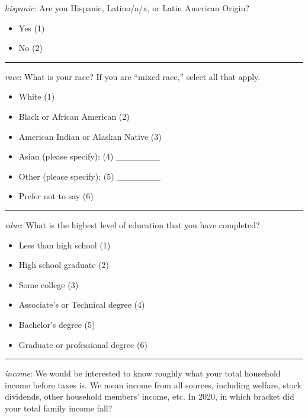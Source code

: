 \emph{hispanic}: Are you Hispanic, Latino/a/x, or Latin American Origin?

\begin{itemize}
\tightlist
\item
  Yes (1)
\item
  No (2)
\end{itemize}

\begin{center}\rule{0.5\linewidth}{0.5pt}\end{center}

\emph{race}: What is your race? If you are ``mixed race,'' select all that apply.

\begin{itemize}
\tightlist
\item
  White (1)
\item
  Black or African American (2)
\item
  American Indian or Alaskan Native (3)
\item
  Asian (please specify): (4) \_\_\_\_\_\_\_
\item
  Other (please specify): (5) \_\_\_\_\_\_\_
\item
  Prefer not to say (6)
\end{itemize}

\begin{center}\rule{0.5\linewidth}{0.5pt}\end{center}

\emph{educ}: What is the highest level of education that you have completed?

\begin{itemize}
\tightlist
\item
  Less than high school (1)
\item
  High school graduate (2)
\item
  Some college (3)
\item
  Associate's or Technical degree (4)
\item
  Bachelor's degree (5)
\item
  Graduate or professional degree (6)
\end{itemize}

\begin{center}\rule{0.5\linewidth}{0.5pt}\end{center}

\emph{income}: We would be interested to know roughly what your total household income
before taxes is. We mean income from all sources, including welfare, stock
dividends, other household members' income, etc. In 2020, in which bracket did your total family income fall?

